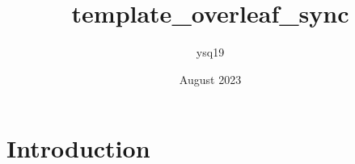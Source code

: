 \documentclass{article}
\title{template_overleaf_sync}
\author{ysq19 }
\date{August 2023}
\begin{document}
\maketitle

\section{Introduction}
\end{document}
